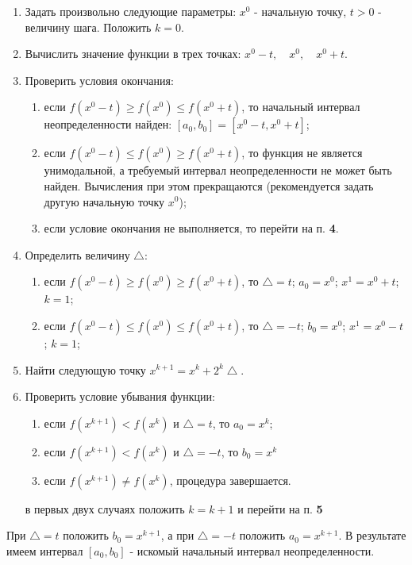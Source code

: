 \documentclass[a4paper, 12pt]{article}   	%
\begin{document}
    \begin{enumerate}
        \item Задать произвольно следующие параметры: $x^0$ - начальную точку, $t > 0$ - величину шага. Положить $k = 0$.
        \item Вычислить значение функции в трех точках: $x^0 - t, \quad x^0, \quad x^0 + t$.
        \item Проверить условия окончания:
        \begin{enumerate}
            \item если $f(x^0 - t) \geq f(x^0) \leq f(x^0 + t)$, то начальный интервал неопределенности найден: $[a_0, b_0] = [x^0 - t, x^0 + t]$;
            \item если $f(x^0 - t) \leq f(x^0) \geq f(x^0 + t)$, то функция не является унимодальной, а требуемый интервал неопределенности не может быть найден. Вычисления при этом прекращаются (рекомендуется задать другую начальную точку $x^0$);
            \item если условие окончания не выполняется, то перейти на п. \textbf{4}.
        \end{enumerate}
        \item Определить величину $\bigtriangleup$:
        \begin{enumerate}
            \item если $f(x^0 - t) \geq f(x^0) \geq f(x^0 + t)$, то $\bigtriangleup = t$; $a_0 = x^0$; $x^1 = x^0 + t$; $k=1$;
            \item если $f(x^0 - t) \leq f(x^0) \leq f(x^0 + t)$, то $\bigtriangleup = -t$; $b_0 = x^0$; $x^1 = x^0 - t$; $k=1$;
        \end{enumerate}
        \item Найти следующую точку $x^{k+1} = x^k + 2^k \bigtriangleup$.
        \item Проверить условие убывания функции:
        \begin{enumerate}
            \item если $f(x^{k+1}) < f(x^k)$ и $\bigtriangleup = t$, то $a_0 = x^k$;
            \item если $f(x^{k+1}) < f(x^k)$ и $\bigtriangleup = -t$, то $b_0 = x^k$
            \item если $f(x^{k+1}) \neq f(x^k)$, процедура завершается.
        \end{enumerate}
        в первых двух случаях положить $k = k + 1$ и перейти на п. \textbf{5}
    \end{enumerate}
    При $\bigtriangleup = t$ положить $b_0 = x^{k+1}$, а при $\bigtriangleup = -t$ положить $a_0 = x^{k+1}$. В результате имеем интервал $[a_0, b_0]$ - искомый начальный интервал неопределенности.
    
\end{document}
